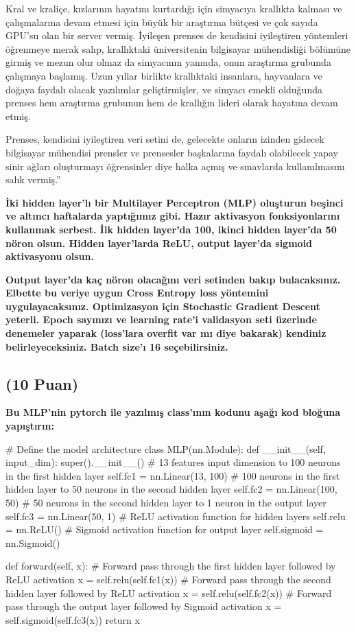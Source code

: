 \documentclass[11pt]{article}
\begin{document}
Kral ve kraliçe, kızlarının hayatını kurtardığı için simyacıya krallıkta kalması ve çalışmalarına devam etmesi için büyük bir araştırma bütçesi ve çok sayıda GPU'su olan bir server vermiş. İyileşen prenses de kendisini iyileştiren yöntemleri öğrenmeye merak salıp, krallıktaki üniversitenin bilgisayar mühendisliği bölümüne girmiş ve mezun olur olmaz da simyacının yanında, onun araştırma grubunda çalışmaya başlamış. Uzun yıllar birlikte krallıktaki insanlara, hayvanlara ve doğaya faydalı olacak yazılımlar geliştirmişler, ve simyacı emekli olduğunda prenses hem araştırma grubunun hem de krallığın lideri olarak hayatına devam etmiş.

Prenses, kendisini iyileştiren veri setini de, gelecekte onların izinden gidecek bilgisayar mühendisi prensler ve prensesler başkalarına faydalı olabilecek yapay sinir ağları oluşturmayı öğrensinler diye halka açmış ve sınavlarda kullanılmasını salık vermiş.''

\textbf{İki hidden layer'lı bir Multilayer Perceptron (MLP) oluşturun beşinci ve altıncı haftalarda yaptığımız gibi. Hazır aktivasyon fonksiyonlarını kullanmak serbest. İlk hidden layer'da 100, ikinci hidden layer'da 50 nöron olsun. Hidden layer'larda ReLU, output layer'da sigmoid aktivasyonu olsun.}

\textbf{Output layer'da kaç nöron olacağını veri setinden bakıp bulacaksınız. Elbette bu veriye uygun Cross Entropy loss yöntemini uygulayacaksınız. Optimizasyon için Stochastic Gradient Descent yeterli. Epoch sayınızı ve learning rate'i validasyon seti üzerinde denemeler yaparak (loss'lara overfit var mı diye bakarak) kendiniz belirleyeceksiniz. Batch size'ı 16 seçebilirsiniz.}

\newpage

\subsection{(10 Puan)} \textbf{Bu MLP'nin pytorch ile yazılmış class'ının kodunu aşağı kod bloğuna yapıştırın:}

\begin{python}
# Define the model architecture
class MLP(nn.Module):
    def __init__(self, input_dim):
        super().__init__()
        # 13 features input dimension to 100 neurons in the first hidden layer
        self.fc1 = nn.Linear(13, 100)
        # 100 neurons in the first hidden layer to 50 neurons in the second hidden layer
        self.fc2 = nn.Linear(100, 50)
        # 50 neurons in the second hidden layer to 1 neuron in the output layer
        self.fc3 = nn.Linear(50, 1)
        # ReLU activation function for hidden layers
        self.relu = nn.ReLU()
        # Sigmoid activation function for output layer
        self.sigmoid = nn.Sigmoid()

    def forward(self, x):
        # Forward pass through the first hidden layer followed by ReLU activation
        x = self.relu(self.fc1(x))
        # Forward pass through the second hidden layer followed by ReLU activation
        x = self.relu(self.fc2(x))
        # Forward pass through the output layer followed by Sigmoid activation
        x = self.sigmoid(self.fc3(x))
        return x
\end{python}
\end{document}
